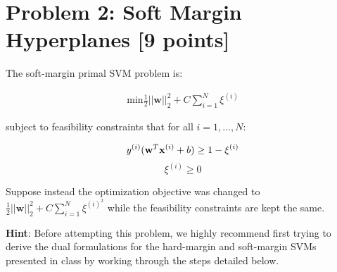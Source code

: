 \section*{Problem 2: Soft Margin Hyperplanes [9 points]}
The soft-margin primal SVM problem is:

\begin{align}\label{eqn:soft-svm}\text{min} \frac{1}{2} ||\textbf{w}||_2^2 + C \sum_{i=1}^N \xi^{(i)} \end{align}

subject to feasibility constraints that for all $i=1,...,N$:

$$y^{(i)}(\textbf{w}^T \mathbf{x}^{(i)} + b) \geq 1 - \xi^{(i)}$$
$$\xi^{(i)} \geq 0$$

Suppose instead the optimization objective was  changed to $\frac{1}{2}||\textbf{w}||_2^2 + C \sum_{i=1}^N \xi^{(i)}^2$ while the feasibility constraints are kept the same. 

\textbf{Hint}: Before attempting this problem, we highly recommend first trying to derive the dual formulations for the hard-margin and soft-margin SVMs presented in class by working through the steps detailed below.

